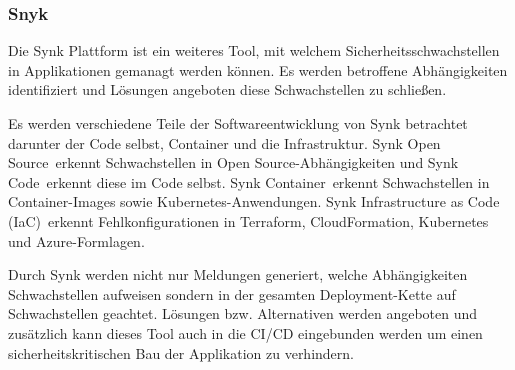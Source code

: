 \subsubsection{Snyk} \label{sec:Snyk}
    Die Synk Plattform ist ein weiteres Tool, mit welchem Sicherheitsschwachstellen in Applikationen gemanagt werden können. %
    Es werden betroffene Abhängigkeiten identifiziert und Lösungen angeboten diese Schwachstellen zu schließen.

    Es werden verschiedene Teile der Softwareentwicklung von Synk betrachtet darunter der Code selbst, Container und die Infrastruktur.
    \glqq Synk Open Source\grqq~erkennt Schwachstellen in \glqq Open Source\grqq-Abhängigkeiten und \glqq Synk Code\grqq~erkennt diese im Code selbst.
    \glqq Synk Container\grqq~erkennt Schwachstellen in Container-Images sowie Kubernetes-Anwendungen.
    \glqq Synk Infrastructure as Code (IaC)\grqq~erkennt Fehlkonfigurationen in Terraform, CloudFormation, Kubernetes und Azure-Formlagen.

    Durch Synk werden nicht nur Meldungen generiert, welche Abhängigkeiten Schwachstellen aufweisen sondern in der gesamten Deployment-Kette auf Schwachstellen geachtet.
    Lösungen bzw. Alternativen werden angeboten und zusätzlich kann dieses Tool auch in die CI/CD eingebunden werden um einen sicherheitskritischen Bau der Applikation zu verhindern.   